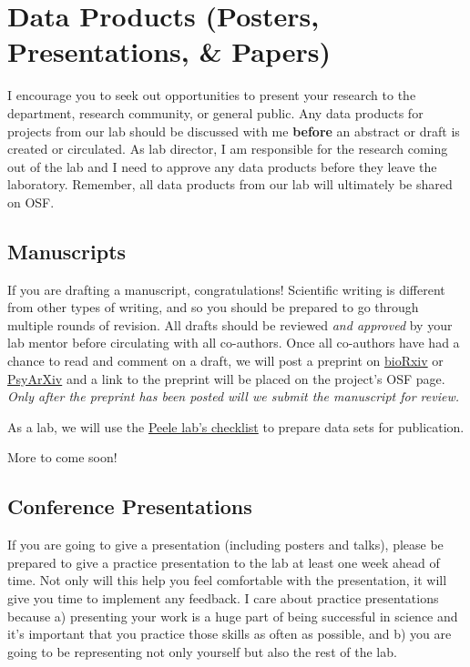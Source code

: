 \documentclass[
]{book}
\begin{document}
\hypertarget{data-products-posters-presentations-papers}{%
\section{Data Products (Posters, Presentations, \& Papers)}\label{data-products-posters-presentations-papers}}

I encourage you to seek out opportunities to present your research to the department, research community, or general public. Any data products for projects from our lab should be discussed with me \textbf{before} an abstract or draft is created or circulated. As lab director, I am responsible for the research coming out of the lab and I need to approve any data products before they leave the laboratory. Remember, all data products from our lab will ultimately be shared on OSF.

\hypertarget{manuscripts}{%
\subsection{Manuscripts}\label{manuscripts}}

If you are drafting a manuscript, congratulations! Scientific writing is different from other types of writing, and so you should be prepared to go through multiple rounds of revision. All drafts should be reviewed \emph{and approved} by your lab mentor before circulating with all co-authors. Once all co-authors have had a chance to read and comment on a draft, we will post a preprint on \href{https://www.biorxiv.org/}{bioRxiv} or \href{https://psyarxiv.com/}{PsyArXiv} and a link to the preprint will be placed on the project's OSF page. \emph{Only after the preprint has been posted will we submit the manuscript for review.}

As a lab, we will use the \href{https://github.com/jpeelle/paperchecklist/blob/master/checklist.pdf}{Peele lab's checklist} to prepare data sets for publication.

More to come soon!

\hypertarget{conference-presentations}{%
\subsection{Conference Presentations}\label{conference-presentations}}

If you are going to give a presentation (including posters and talks), please be prepared to give a practice presentation to the lab at least one week ahead of time. Not only will this help you feel comfortable with the presentation, it will give you time to implement any feedback. I care about practice presentations because a) presenting your work is a huge part of being successful in science and it's important that you practice those skills as often as possible, and b) you are going to be representing not only yourself but also the rest of the lab.
\end{document}
